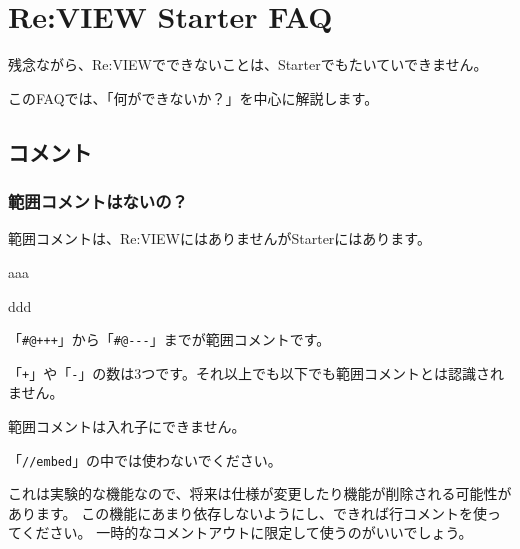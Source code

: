 \chapter{Re:VIEW Starter FAQ}
\label{chap:chap02-faq}
\begin{starterabstract}
残念ながら、Re:VIEWでできないことは、Starterでもたいていできません。

このFAQでは、「何ができないか？」を中心に解説します。
\end{starterabstract}

\section{コメント}
\label{sec:2-1}

\subsection*{範囲コメントはないの？}
\label{sec:2-1-1}

範囲コメントは、Re:VIEWにはありませんがStarterにはあります。

\begin{starterprogram}\end{starterprogram}
\noindent
{}

\starterresult

aaa

ddd

\endstarterresult

\begin{starteritemize}
\item 「\texttt{\#@+++}」から「\texttt{\#@{-}{-}{-}}」までが範囲コメントです。
\item 「\texttt{+}」や「\texttt{{-}}」の数は3つです。それ以上でも以下でも範囲コメントとは認識されません。
\item 範囲コメントは入れ子にできません。
\item 「\texttt{//embed}」の中では使わないでください。
\item これは実験的な機能なので、将来は仕様が変更したり機能が削除される可能性があります。
   この機能にあまり依存しないようにし、できれば行コメントを使ってください。
   一時的なコメントアウトに限定して使うのがいいでしょう。
\end{starteritemize}

